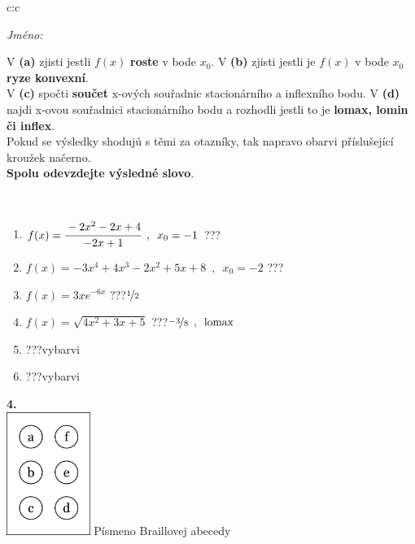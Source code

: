 \documentclass[10pt]{report}
\begin{document}
\begin{tabular}{c:c}
\begin{minipage}[c][104.5mm][t]{0.5\linewidth}
\begin{center}
\textit{Jméno:}\phantom{xxxxxxxxxxxxxxxxxxxxxxxxxxxxxxxxxxxxxxxxxxxxxxxxxxxxxxxxxxxxxxxxx}\\[5mm]
\begin{minipage}{0.95\linewidth}
\begin{center}
{\small V \textbf{(a)} zjisti jestli $f(x)$ \textbf{roste} v bode $x_0$. V \textbf{(b)} zjisti jestli je $f(x)$ v bode $x_0$ \textbf{ryze konvexní}.\\V \textbf{(c)} spočti \textbf{součet} x-ových souřadnic stacionárního a inflexního bodu. V \textbf{(d)} najdi x-ovou souřadnici stacionárního bodu a rozhodli jestli to je \textbf{lomax, lomin či inflex}.\\Pokud se výsledky shodujú s těmi za otazníky, tak napravo obarvi příslušející kroužek načerno.\\\textbf{Spolu odevzdejte výsledné slovo}}.
\end{center}
\end{minipage}
\\[1mm]
\begin{minipage}{0.79\linewidth}
\begin{center}
\begin{varwidth}{\linewidth}
\begin{enumerate}
\normalsize
\item $f(x)=\cfrac{-2x^2-2x+4}{-2x+1}\enspace , \enspace x_0=-1$\quad \dotfill\; ???\;\dotfill \quad {}
\item $f(x)=-3x^4+4x^3-2x^2+5x+8\enspace , \enspace x_0=-2$\quad \dotfill\; ???\;\dotfill \quad {}
\item $f(x)=3xe^{-6x}$\quad \dotfill\; ???\;\dotfill \quad $\nicefrac{1}{2}$
\item $f(x)=\sqrt{4x^2+3x+5}$\quad \dotfill\; ???\;\dotfill \quad $\nicefrac{-3}{8}\enspace , \enspace\mathrm{lomax}$
\item \quad \dotfill\; ???\;\dotfill \quad vybarvi
\item \quad \dotfill\; ???\;\dotfill \quad vybarvi
\end{enumerate}
\end{varwidth}
\end{center}
\end{minipage}
\begin{minipage}{0.20\linewidth}
\begin{center}
{\Huge\bfseries 4.} \\[2mm]
\includegraphics[height=40mm]{../images/braille.png}
{\small Písmeno Braillovej abecedy}
\end{center}
\end{minipage}
\end{center}
\end{minipage}
%
\end{tabular}
\end{document}
